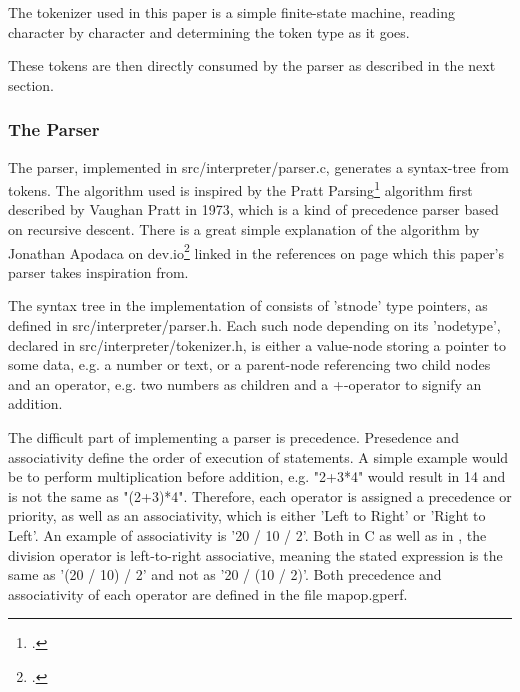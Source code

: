 \documentclass[12pt,a4paper,man]{apa7}
\begin{document}
The tokenizer used in this paper is a simple finite-state machine, reading
character by character and determining the token type as it goes.

These tokens are then directly consumed by the parser as described in the next
section.

\subsubsection{The Parser}
The parser, implemented in src/interpreter/parser.c, generates a syntax-tree
from tokens. The algorithm used is inspired by the Pratt Parsing\footcite{pratt}
algorithm first described by Vaughan Pratt in 1973, which is a kind of precedence
parser based on recursive descent. There is a great simple explanation of the algorithm
by Jonathan Apodaca on dev.io\footcite{devio} linked in the references on page 
\pageref{bibliography} which this paper's parser takes inspiration from.

The syntax tree in the implementation of \name consists of 'stnode' type
pointers, as defined in src/interpreter/parser.h. Each such node depending
on its 'nodetype', declared in src/interpreter/tokenizer.h,
is either a value-node storing a pointer to some data, e.g. a number or text, or a
parent-node referencing two child nodes and an operator, e.g. two numbers as
children and a +-operator to signify an addition.

The difficult part of implementing a parser is precedence. Presedence and
associativity define the order of execution of statements. A simple example
would be to perform multiplication before addition, e.g. "2+3*4" would
result in 14 and is not the same as "(2+3)*4". Therefore, each operator is
assigned a precedence or priority, as well as an associativity, which is
either 'Left to Right' or 'Right to Left'. An example of associativity is
'20 / 10 / 2'. Both in C as well as in \name, the division operator is
left-to-right associative, meaning the stated expression is the same as
'(20 / 10) / 2' and not as '20 / (10 / 2)'. Both precedence and associativity
of each operator are defined in the file mapop.gperf.
\end{document}
